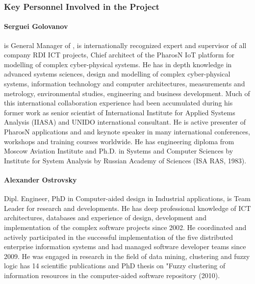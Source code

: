 \documentclass[a4paper,11pt]{article}
\begin{document}
\subsubsection*{Key Personnel Involved in the Project}

\paragraph{Serguei Golovanov} is General Manager of \GOLEMlong, is internationally recognized expert and supervisor of all company RDI ICT projects, Chief architect of the PharosN IoT platform for modelling of complex cyber-physical systems. He has in depth knowledge in advanced systems sciences, design and modelling of complex cyber-physical systems, information technology and computer architectures, measurements and metrology, environmental studies, engineering and business development. Much of this international collaboration experience had been accumulated during his former work as senior scientist of International Institute for Applied Systems Analysis (IIASA) and UNIDO international consultant. He is active presenter of PharosN applications and and keynote speaker in many international conferences, workshops and training courses worldwide. He has engineering diploma from Moscow Aviation Institute and Ph.D. in Systems and Computer Sciences by Institute for System Analysis by Russian Academy of Sciences (ISA RAS, 1983).

\paragraph{Alexander Ostrovsky} Dipl. Engineer, PhD in Computer-aided design in Industrial applications, is Team Leader for research and developments. He has deep professional knowledge of ICT architectures, databases and experience of design, development and implementation of the complex software projects since 2002. He coordinated and actively participated in the successful implementation of the five distributed enterprise information systems and had managed software developer teams since 2009. He was engaged in research in the field of data mining, clustering and fuzzy logic has 14 scientific publications and PhD thesis on "Fuzzy clustering of information resources in the computer-aided software repository (2010).
\end{document}
